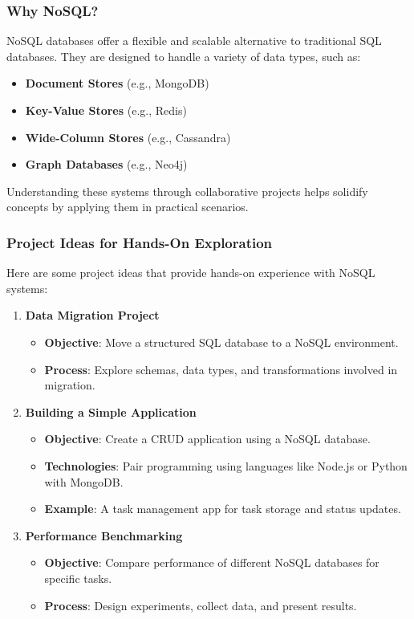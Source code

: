 \documentclass[aspectratio=169]{beamer}
\begin{document}
\begin{frame}[fragile]
    \frametitle{Why NoSQL?}
    NoSQL databases offer a flexible and scalable alternative to traditional SQL databases. 
    They are designed to handle a variety of data types, such as:
    \begin{itemize}
        \item \textbf{Document Stores} (e.g., MongoDB)
        \item \textbf{Key-Value Stores} (e.g., Redis)
        \item \textbf{Wide-Column Stores} (e.g., Cassandra)
        \item \textbf{Graph Databases} (e.g., Neo4j)
    \end{itemize}
    Understanding these systems through collaborative projects helps solidify concepts by applying them in practical scenarios.
\end{frame}

\begin{frame}[fragile]
    \frametitle{Project Ideas for Hands-On Exploration}
    Here are some project ideas that provide hands-on experience with NoSQL systems:
    \begin{enumerate}
        \item \textbf{Data Migration Project}  
            \begin{itemize}
                \item \textbf{Objective}: Move a structured SQL database to a NoSQL environment.
                \item \textbf{Process}: Explore schemas, data types, and transformations involved in migration.
            \end{itemize}

        \item \textbf{Building a Simple Application}  
            \begin{itemize}
                \item \textbf{Objective}: Create a CRUD application using a NoSQL database.
                \item \textbf{Technologies}: Pair programming using languages like Node.js or Python with MongoDB.
                \item \textbf{Example}: A task management app for task storage and status updates.
            \end{itemize}
        
        \item \textbf{Performance Benchmarking}  
            \begin{itemize}
                \item \textbf{Objective}: Compare performance of different NoSQL databases for specific tasks.
                \item \textbf{Process}: Design experiments, collect data, and present results.
            \end{itemize}
    \end{enumerate}
\end{frame}
\end{document}
